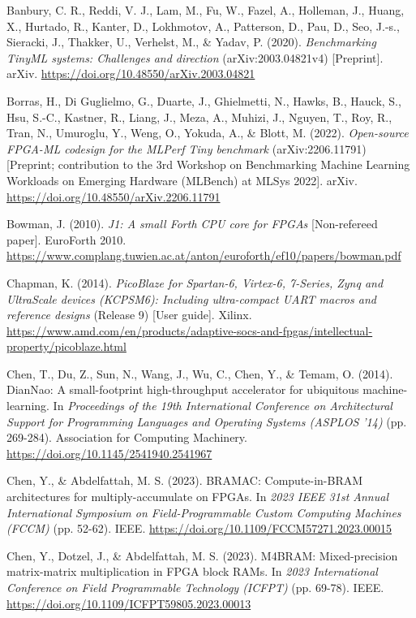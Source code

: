 \begin{apareferences}
Banbury, C. R., Reddi, V. J., Lam, M., Fu, W., Fazel, A., Holleman, J., Huang, X., Hurtado, R., Kanter, D., Lokhmotov, A., Patterson, D., Pau, D., Seo, J.-s., Sieracki, J., Thakker, U., Verhelst, M., \& Yadav, P. (2020). \emph{Benchmarking TinyML systems: Challenges and direction} (arXiv:2003.04821v4) {[}Preprint{]}. arXiv. \url{https://doi.org/10.48550/arXiv.2003.04821}

Borras, H., Di Guglielmo, G., Duarte, J., Ghielmetti, N., Hawks, B., Hauck, S., Hsu, S.-C., Kastner, R., Liang, J., Meza, A., Muhizi, J., Nguyen, T., Roy, R., Tran, N., Umuroglu, Y., Weng, O., Yokuda, A., \& Blott, M. (2022). \emph{Open-source FPGA-ML codesign for the MLPerf Tiny benchmark} (arXiv:2206.11791) {[}Preprint; contribution to the 3rd Workshop on Benchmarking Machine Learning Workloads on Emerging Hardware (MLBench) at MLSys 2022{]}. arXiv. \url{https://doi.org/10.48550/arXiv.2206.11791}

Bowman, J. (2010). \emph{J1: A small Forth CPU core for FPGAs} {[}Non-refereed paper{]}. EuroForth 2010. \url{https://www.complang.tuwien.ac.at/anton/euroforth/ef10/papers/bowman.pdf}

Chapman, K. (2014). \emph{PicoBlaze for Spartan-6, Virtex-6, 7-Series, Zynq and UltraScale devices (KCPSM6): Including ultra-compact UART macros and reference designs} (Release 9) {[}User guide{]}. Xilinx. \url{https://www.amd.com/en/products/adaptive-socs-and-fpgas/intellectual-property/picoblaze.html}

Chen, T., Du, Z., Sun, N., Wang, J., Wu, C., Chen, Y., \& Temam, O. (2014). DianNao: A small-footprint high-throughput accelerator for ubiquitous machine-learning. In \emph{Proceedings of the 19th International Conference on Architectural Support for Programming Languages and Operating Systems (ASPLOS '14)} (pp. 269-284). Association for Computing Machinery. \url{https://doi.org/10.1145/2541940.2541967}

Chen, Y., \& Abdelfattah, M. S. (2023). BRAMAC: Compute-in-BRAM architectures for multiply-accumulate on FPGAs. In \emph{2023 IEEE 31st Annual International Symposium on Field-Programmable Custom Computing Machines (FCCM)} (pp. 52-62). IEEE. \url{https://doi.org/10.1109/FCCM57271.2023.00015}

Chen, Y., Dotzel, J., \& Abdelfattah, M. S. (2023). M4BRAM: Mixed-precision matrix-matrix multiplication in FPGA block RAMs. In \emph{2023 International Conference on Field Programmable Technology (ICFPT)} (pp. 69-78). IEEE. \url{https://doi.org/10.1109/ICFPT59805.2023.00013}


\end{apareferences}
